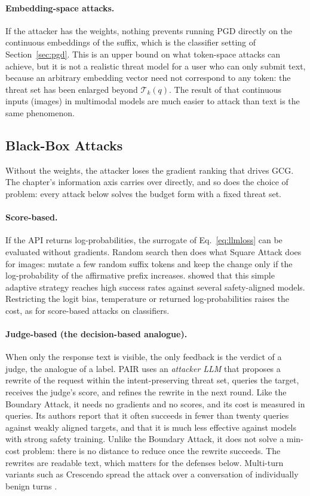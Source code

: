 \documentclass[10pt,a4paper]{extarticle}
\theoremstyle{definition}
\newcommand{\T}{\mathcal{T}}
\begin{document}
\paragraph{Embedding-space attacks.} If the attacker has the weights, nothing prevents running PGD directly on the continuous embeddings of the suffix, which is the classifier setting of Section~\ref{sec:pgd}. This is an upper bound on what token-space attacks can achieve, but it is not a realistic threat model for a user who can only submit text, because an arbitrary embedding vector need not correspond to any token: the threat set has been enlarged beyond \(\T_k(q)\). The result of \citet{carlini2023aligned} that continuous inputs (images) in multimodal models are much easier to attack than text is the same phenomenon.

\subsection{Black-Box Attacks}\label{sec:llmblack}

Without the weights, the attacker loses the gradient ranking that drives GCG. The chapter's information axis carries over directly, and so does the choice of problem: every attack below solves the budget form with a fixed threat set.

\paragraph{Score-based.} If the API returns log-probabilities, the surrogate of Eq.~\eqref{eq:llmloss} can be evaluated without gradients. Random search then does what Square Attack does for images: mutate a few random suffix tokens and keep the change only if the log-probability of the affirmative prefix increases. \citet{andriushchenko2024simple} showed that this simple adaptive strategy reaches high success rates against several safety-aligned models. Restricting the logit bias, temperature or returned log-probabilities raises the cost, as for score-based attacks on classifiers.

\paragraph{Judge-based (the decision-based analogue).} When only the response text is visible, the only feedback is the verdict of a judge, the analogue of a label. PAIR \citep{chao2023jailbreaking} uses an \emph{attacker LLM} that proposes a rewrite of the request within the intent-preserving threat set, queries the target, receives the judge's score, and refines the rewrite in the next round. Like the Boundary Attack, it needs no gradients and no scores, and its cost is measured in queries. Its authors report that it often succeeds in fewer than twenty queries against weakly aligned targets, and that it is much less effective against models with strong safety training. Unlike the Boundary Attack, it does not solve a min-cost problem: there is no distance to reduce once the rewrite succeeds. The rewrites are readable text, which matters for the defenses below. Multi-turn variants such as Crescendo spread the attack over a conversation of individually benign turns \citep{nist2025ai1002}.
\end{document}
